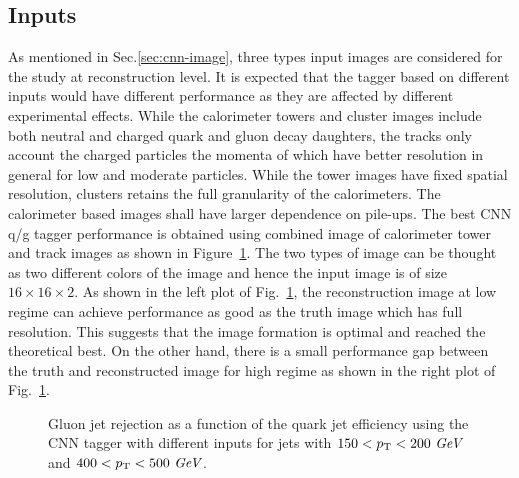 \subsection{Inputs}

As mentioned in Sec.\ref{sec:cnn-image}, three types input images are considered for the study at reconstruction level.
It is expected that the tagger based on different inputs would have different performance as they are affected
by different experimental effects. While the calorimeter towers and cluster images include both neutral and charged quark
and gluon decay daughters, the tracks only account the charged particles the momenta of which have better resolution
in general for low and moderate \pt particles. While the tower images have fixed spatial resolution,
clusters retains the full granularity of the calorimeters. The calorimeter based images shall have larger dependence on pile-ups.
The best CNN q/g tagger performance is obtained using combined image of calorimeter tower and track images as shown in
Figure~\ref{fig:cnn-input}.
The two types of image can be thought as two different colors of the image and hence the input image is of size $16\times 16\times 2$.
As shown in the left plot of Fig.~\ref{fig:cnn-input}, the reconstruction image at low \pt regime can achieve performance as good as
the truth image which has full resolution. This suggests that the image formation is optimal and reached the theoretical best. On the other hand,
there is a small performance gap between the truth and reconstructed image for high \pt regime as shown in the right plot of Fig.~\ref{fig:cnn-input}.

\begin{figure}[htpb]
\begin{center}
\caption{Gluon jet rejection as a function of the quark jet efficiency using the CNN tagger with different inputs
for jets with \protect{} $150<p_{{\rm T}}<200~\textit{GeV}$ and \protect{} $400<p_{{\rm T}}<500~\textit{GeV}$.}
\label{fig:cnn-input}
\end{center}
\end{figure}


